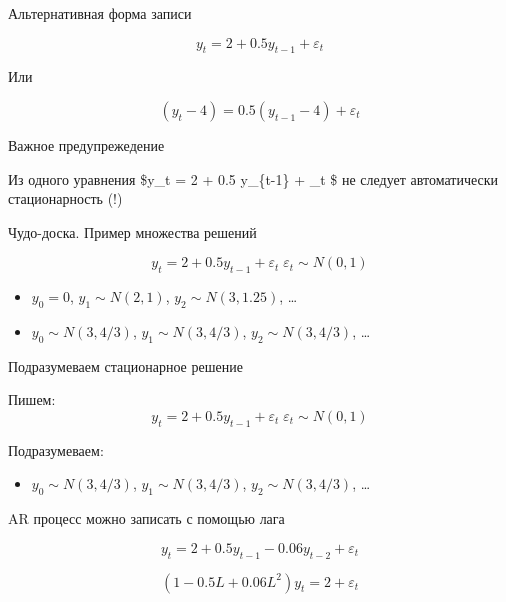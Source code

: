 \documentclass[ignorenonframetext,]{beamer}
\begin{document}
\begin{frame}{Альтернативная форма записи}

\[
y_t = 2 + 0.5 y_{t-1} + \varepsilon_t
\]

Или

\[
(y_t - 4) = 0.5 (y_{t-1} - 4) + \varepsilon_t
\]

\end{frame}

\begin{frame}{Важное предупрежедение}

Из одного уравнения \$y\_t = 2 + 0.5 y\_\{t-1\} + \varepsilon\_t \$ не
следует автоматически стационарность (!)

\end{frame}

\begin{frame}{Чудо-доска. Пример множества решений}

\[
y_t = 2 + 0.5 y_{t-1} + \varepsilon_t \; \varepsilon_t \sim N(0,1)
\]

\begin{itemize}
\item
  $y_0=0$, $y_1\sim N(2,1)$, $y_2\sim N(3, 1.25)$, \ldots
\item
  $y_0\sim N(3, 4/3)$, $y_1\sim N(3, 4/3)$, $y_2\sim N(3, 4/3)$, \ldots
\end{itemize}

\end{frame}

\begin{frame}{Подразумеваем стационарное решение}

Пишем: \[
y_t = 2 + 0.5 y_{t-1} + \varepsilon_t \; \varepsilon_t \sim N(0,1)
\]

Подразумеваем:

\begin{itemize}
\itemsep1pt\parskip0pt
\item
  $y_0\sim N(3, 4/3)$, $y_1\sim N(3, 4/3)$, $y_2\sim N(3, 4/3)$, \ldots
\end{itemize}

\end{frame}

\begin{frame}{AR процесс можно записать с помощью лага}

\[
y_t=2+0.5y_{t-1}-0.06y_{t-2}+\varepsilon_t
\]

\[
(1-0.5L+0.06L^2)y_t=2+\varepsilon_t
\]

\end{frame}
\end{document}
